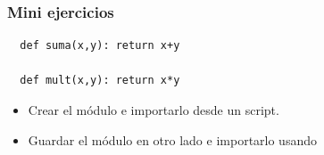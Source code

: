 \documentclass[14pt,aspectratio=169,xcolor=dvipsnames]{beamer}
\begin{document}
\begin{frame}
    \maketitle
\end{frame}
\begin{frame}[fragile]\frametitle{Mini ejercicios}
    \begin{verbatim}
  def suma(x,y): return x+y

  def mult(x,y): return x*y
    \end{verbatim}

    \begin{itemize}
        \item Crear el módulo  e importarlo desde un script.
        \item Guardar el módulo en otro lado e importarlo usando 
    \end{itemize}

\end{frame}
\end{document}
